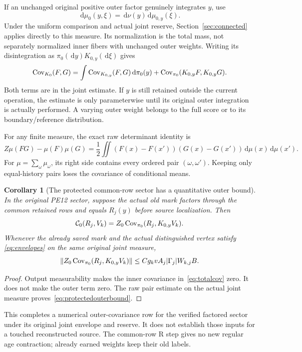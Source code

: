 \documentclass[11pt,letterpaper]{article}
\theoremstyle{plain}
\newtheorem{corollary}[theorem]{Corollary}
\theoremstyle{remark}\newtheorem{remark}[theorem]{Scope}
\newcommand{\dd}{\,\mathrm d}\newcommand{\OH}{\mathcal O_H}
\begin{document}
If an unchanged original positive outer factor genuinely integrates $y$, use
\begin{equation}
\dd\mu_0(y,\xi)=\dd\nu(y)\dd\mu_{0,y}(\xi).
\label{eq:joint}
\end{equation}
Under the uniform comparison and actual joint reserve, Section~\ref{sec:connected}
applies directly to this measure. Its normalization is the total mass, not
separately normalized inner fibers with unchanged outer weights.
Writing its disintegration as $\pi_0(\dd y)K_{0,y}(\dd\xi)$ gives
\begin{equation}
\Cov_{K_0}(F,G)
=\int\Cov_{K_{0,y}}(F,G)\dd\pi_0(y)
+\Cov_{\pi_0}(K_{0,y}F,K_{0,y}G).
\label{eq:totalcov}
\end{equation}
Both terms are in the joint estimate. If $y$ is still retained outside the
current operation, the estimate is only parameterwise until its original
outer integration is actually performed. A varying outer weight belongs to
the full score or to its boundary/reference distribution.

For any finite measure, the exact raw determinant identity is
\begin{equation}
Z\mu(FG)-\mu(F)\mu(G)
=\frac12\iint(F(x)-F(x'))(G(x)-G(x'))\dd\mu(x)\dd\mu(x').
\label{eq:twocopycov}
\end{equation}
For $\mu=\sum_\omega\mu_\omega$, its right side contains every ordered pair
$(\omega,\omega')$. Keeping only equal-history pairs loses the covariance
of conditional means.

\begin{corollary}[The protected common-row sector has a quantitative outer bound]
In the original PE12 sector, suppose the actual old mark factors through
the common retained rows and equals $R_j(y)$ before source localization.
Then
\begin{equation}
\mathcal C_0(R_j,V_k)=Z_0\operatorname{Cov}_{\pi_0}(R_j,K_{0,y}V_k).
\label{eq:protectedouter}
\end{equation}
Whenever the already saved mark and the actual distinguished vertex satisfy
\eqref{eq:envelopes} on the same original joint measure,
\begin{equation}
\left\|Z_0\operatorname{Cov}_{\pi_0}(R_j,K_{0,y}V_k)\right\|
\le C g_kvA_j|\Gamma_j|W_{k,j}B.
\label{eq:protectedouterbound}
\end{equation}
\end{corollary}
\begin{proof}
Output measurability makes the inner covariance in~\eqref{eq:totalcov} zero.
It does not make the outer term zero. The raw pair estimate on the actual
joint measure proves~\eqref{eq:protectedouterbound}.
\end{proof}
This completes a numerical outer-covariance row for the verified factored
sector under its original joint envelope and reserve. It does not establish
those inputs for a touched reconstructed source. The common-row R step gives
no new regular age contraction; already earned weights keep their old labels.
\end{document}
